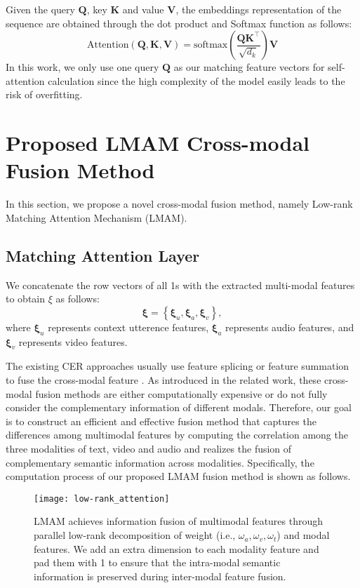 {{{Given the query $\boldsymbol{Q}$, key $\boldsymbol{K}$ and value $\boldsymbol{V}$, the embeddings representation of the sequence are obtained through the dot product and Softmax function as follows:}
\begin{equation}
\text{Attention}
(\boldsymbol{Q},\boldsymbol{K},\boldsymbol{V})=\text{softmax}\left(\frac{\boldsymbol{QK}^\top}{\sqrt{d_k}}\right)\boldsymbol{V}
\end{equation}
{In this work, we only use one query $\boldsymbol{Q}$ as our matching feature vectors for self-attention calculation since the high complexity of the model easily leads to the risk of overfitting.}

\section{Proposed LMAM Cross-modal Fusion Method}
In this section, we propose a novel cross-modal fusion method, namely Low-rank Matching Attention Mechanism (LMAM).

\subsection{Matching Attention Layer}
We concatenate the row vectors of all 1s with the extracted multi-modal features to obtain $\xi$ as follows:
\begin{equation}
	\boldsymbol{\xi}=\left\{\boldsymbol{\xi}_u, \boldsymbol{\xi}_a, \boldsymbol{\xi}_v\right\},
\end{equation}
where $\boldsymbol{\xi}_u$ represents context utterence features, $\boldsymbol{\xi}_a$ represents audio features, and $\boldsymbol{\xi}_v$ represents video features.

The existing CER approaches usually use feature splicing or feature summation to fuse the cross-modal feature \cite{zadeh2017tensor,Liu2018EfficientLM,hu2021mmgcn,Liu2018EfficientLM}. As introduced in the related work, these cross-modal fusion methods are either computationally expensive or do not fully consider the complementary information of different modals. Therefore, our goal is to construct an efficient and effective fusion method that captures the differences among multimodal features by computing the correlation among the three modalities of text, video and audio and realizes the fusion of complementary semantic information across modalities. Specifically, the computation process of our proposed LMAM fusion method is shown as follows.

\begin{figure*}
	\centering
	\texttt{[image: low-rank\_attention]}
	\caption{LMAM achieves information fusion of multimodal features through parallel low-rank decomposition of weight (i.e., $\omega_a, \omega_v, \omega_t$) and modal features. We add an extra dimension to each modality feature and pad them with 1 to ensure that the intra-modal semantic information is preserved during inter-modal feature fusion.}
	\label{fig:low-rank-attention}
\end{figure*}

}}
